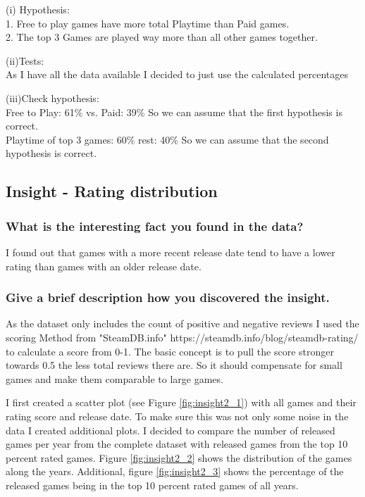 \documentclass[11pt]{article}
\begin{document}
(i) Hypothesis:\\
1. Free to play games have more total Playtime than Paid games.\\
2. The top 3 Games are played way more than all other games together.

(ii)Tests:\\
As I have all the data available I decided to just use the calculated 
percentages

(iii)Check hypothesis:\\
Free to Play: 61\% vs. Paid: 39\% So we can assume that the first hypothesis is correct.\\
Playtime of top 3 games:  60\% rest: 40\% So we can assume that the second hypothesis is correct.

\subsection{Insight - Rating distribution}

\subsubsection{What is the interesting fact you found in the data?}

I found out that games with a more recent release date tend to have a lower rating than games with an older release date.\\

\subsubsection{Give a brief description how you discovered the
insight.}

As the dataset only includes the count of positive and negative reviews I used the scoring Method from "SteamDB.info" https://steamdb.info/blog/steamdb-rating/ to calculate a score from 0-1. The basic concept is to pull the score stronger towards 0.5 the less total reviews there are. So it should compensate for small  games and make them comparable to large games. 

I first created a scatter plot (see Figure \ref{fig:insight2_1}) with all games and their rating score and release date. To make sure this was not only some noise in the data I created additional plots. I decided to compare the number of released games per year from the complete dataset with released games from the top 10 percent rated games. Figure \ref{fig:insight2_2} shows the distribution of the games along the years. Additional, figure \ref{fig:insight2_3} shows the percentage of the released games being in the top 10 percent rated games of all years.  
\end{document}
